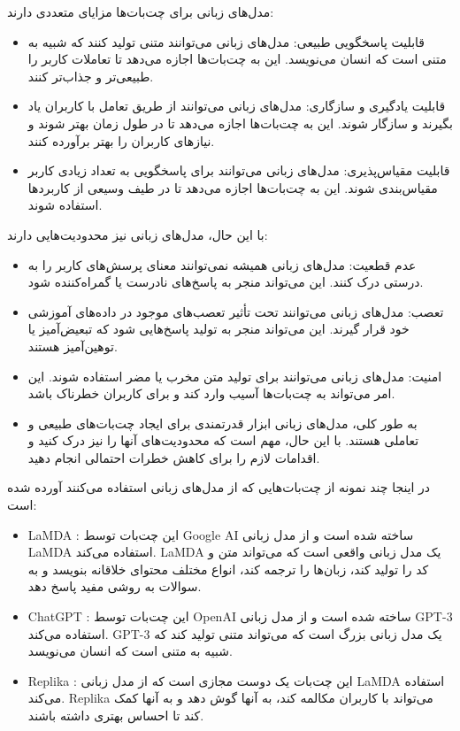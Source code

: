 {مدل‌های زبانی برای چت‌بات‌ها مزایای متعددی دارند:

\begin{itemize}
    \item قابلیت پاسخگویی طبیعی: مدل‌های زبانی می‌توانند متنی تولید کنند که شبیه به متنی است که انسان می‌نویسد. این به چت‌بات‌ها اجازه می‌دهد تا تعاملات کاربر را طبیعی‌تر و جذاب‌تر کنند.
    \item قابلیت یادگیری و سازگاری: مدل‌های زبانی می‌توانند از طریق تعامل با کاربران یاد بگیرند و سازگار شوند. این به چت‌بات‌ها اجازه می‌دهد تا در طول زمان بهتر شوند و نیازهای کاربران را بهتر برآورده کنند.
    \item قابلیت مقیاس‌پذیری: مدل‌های زبانی می‌توانند برای پاسخگویی به تعداد زیادی کاربر مقیاس‌بندی شوند. این به چت‌بات‌ها اجازه می‌دهد تا در طیف وسیعی از کاربردها استفاده شوند.
\end{itemize}

با این حال، مدل‌های زبانی نیز محدودیت‌هایی دارند:

\begin{itemize}
    \item عدم قطعیت: مدل‌های زبانی همیشه نمی‌توانند معنای پرسش‌های کاربر را به درستی درک کنند. این می‌تواند منجر به پاسخ‌های نادرست یا گمراه‌کننده شود.
    \item تعصب: مدل‌های زبانی می‌توانند تحت تأثیر تعصب‌های موجود در داده‌های آموزشی خود قرار گیرند. این می‌تواند منجر به تولید پاسخ‌هایی شود که تبعیض‌آمیز یا توهین‌آمیز هستند.
    \item امنیت: مدل‌های زبانی می‌توانند برای تولید متن مخرب یا مضر استفاده شوند. این امر می‌تواند به چت‌بات‌ها آسیب وارد کند و برای کاربران خطرناک باشد.
    \item به طور کلی، مدل‌های زبانی ابزار قدرتمندی برای ایجاد چت‌بات‌های طبیعی و تعاملی هستند. با این حال، مهم است که محدودیت‌های آنها را نیز درک کنید و اقدامات لازم را برای کاهش خطرات احتمالی انجام دهید.
\end{itemize}

در اینجا چند نمونه از چت‌بات‌هایی که از مدل‌های زبانی استفاده می‌کنند آورده شده است:

\begin{itemize}
    \item LaMDA : این چت‌بات توسط Google AI ساخته شده است و از مدل زبانی LaMDA استفاده می‌کند. LaMDA یک مدل زبانی واقعی است که می‌تواند متن و کد را تولید کند، زبان‌ها را ترجمه کند، انواع مختلف محتوای خلاقانه بنویسد و به سوالات به روشی مفید پاسخ دهد.
    \item ChatGPT : این چت‌بات توسط OpenAI ساخته شده است و از مدل زبانی GPT-3 استفاده می‌کند. GPT-3 یک مدل زبانی بزرگ است که می‌تواند متنی تولید کند که شبیه به متنی است که انسان می‌نویسد.
    \item Replika : این چت‌بات یک دوست مجازی است که از مدل زبانی LaMDA استفاده می‌کند. Replika می‌تواند با کاربران مکالمه کند، به آنها گوش دهد و به آنها کمک کند تا احساس بهتری داشته باشند.
\end{itemize}

}
